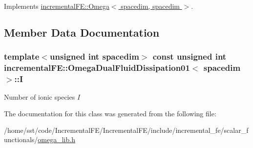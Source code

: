 Implements \hyperlink{classincremental_f_e_1_1_omega_3_01spacedim_00_01spacedim_01_4_a40131354ef0a28ca48a0e6c9ed33aa33}{incremental\+F\+E\+::\+Omega$<$ spacedim, spacedim $>$}.



\subsection{Member Data Documentation}
\subsubsection[{\texorpdfstring{I}{I}}]{\setlength{\rightskip}{0pt plus 5cm}template$<$unsigned int spacedim$>$ const unsigned int {\bf incremental\+F\+E\+::\+Omega\+Dual\+Fluid\+Dissipation01}$<$ spacedim $>$\+::I\hspace{0.3cm}{\ttfamily [private]}}\hypertarget{classincremental_f_e_1_1_omega_dual_fluid_dissipation01_aec63fb36f5a0205121667c38dc0b1b91}{}\label{classincremental_f_e_1_1_omega_dual_fluid_dissipation01_aec63fb36f5a0205121667c38dc0b1b91}
Number of ionic species $I$ 

The documentation for this class was generated from the following file\+:\begin{DoxyCompactItemize}
\item 
/home/sst/code/\+Incremental\+F\+E/\+Incremental\+F\+E/include/incremental\+\_\+fe/scalar\+\_\+functionals/\hyperlink{omega__lib_8h}{omega\+\_\+lib.\+h}\end{DoxyCompactItemize}
